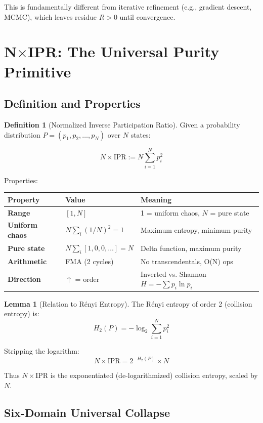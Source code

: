 \documentclass[11pt,oneside]{article}
\theoremstyle{definition}
\newtheorem{lemma}[theorem]{Lemma}
\newtheorem{definition}[theorem]{Definition}
\begin{document}
This is fundamentally different from iterative refinement (e.g., gradient descent, MCMC), which leaves residue $R > 0$ until convergence.

\section{N\ensuremath{\times}IPR: The Universal Purity Primitive}

\subsection{Definition and Properties}

\begin{definition}[Normalized Inverse Participation Ratio]
Given a probability distribution $P = (p_1, p_2, \ldots, p_N)$ over $N$ states:

\[
N \times \text{IPR} := N \sum_{i=1}^{N} p_i^2
\]

Properties:
\begin{center}
\begin{tabular}{lll}
\toprule
Property & Value & Meaning \\
\midrule
\textbf{Range} & $[1, N]$ & 1 = uniform chaos, $N$ = pure state \\
\textbf{Uniform chaos} & $N \sum_i (1/N)^2 = 1$ & Maximum entropy, minimum purity \\
\textbf{Pure state} & $N \sum_i [1, 0, 0, \ldots] = N$ & Delta function, maximum purity \\
\textbf{Arithmetic} & FMA (2 cycles) & No transcendentals, O(N) ops \\
\textbf{Direction} & $\uparrow$ = order & Inverted vs. Shannon $H = -\sum p_i \ln p_i$ \\
\bottomrule
\end{tabular}
\end{center}
\end{definition}

\begin{lemma}[Relation to Rényi Entropy]
The Rényi entropy of order 2 (collision entropy) is:
\[
H_2(P) = -\log_2 \sum_{i=1}^N p_i^2
\]

Stripping the logarithm:
\[
N \times \text{IPR} = 2^{-H_2(P)} \times N
\]

Thus $N \times \text{IPR}$ is the exponentiated (de-logarithmized) collision entropy, scaled by $N$.
\end{lemma}

\subsection{Six-Domain Universal Collapse}
\end{document}
